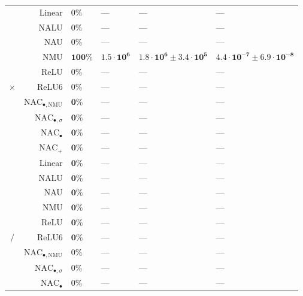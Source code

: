 \begin{longtable}{crllll}
 & Linear & $0\%$ & --- & --- & ---\\

 & NALU & $0\%$ & --- & --- & ---\\

 & NAU & $0\%$ & --- & --- & ---\\

 & NMU & $\mathbf{100\%}$ & $\mathbf{1.5 \cdot 10^{6}}$ & $\mathbf{1.8 \cdot 10^{6} \pm 3.4 \cdot 10^{5}}$ & $\mathbf{4.4 \cdot 10^{-7} \pm 6.9 \cdot 10^{-8}}$\\

 & ReLU & $0\%$ & --- & --- & ---\\

\multirow{-10}{*}{\centering\arraybackslash $\bm{\times}$} & ReLU6 & $0\%$ & --- & --- & ---\\
\cmidrule{1-6}
 & $\mathrm{NAC}_{\bullet,\mathrm{NMU}}$ & $\mathbf{0\%}$ & --- & --- & ---\\

 & $\mathrm{NAC}_{\bullet,\sigma}$ & $\mathbf{0\%}$ & --- & --- & ---\\

 & $\mathrm{NAC}_{\bullet}$ & $\mathbf{0\%}$ & --- & --- & ---\\

 & $\mathrm{NAC}_{+}$ & $\mathbf{0\%}$ & --- & --- & ---\\

 & Linear & $\mathbf{0\%}$ & --- & --- & ---\\

 & NALU & $\mathbf{0\%}$ & --- & --- & ---\\

 & NAU & $\mathbf{0\%}$ & --- & --- & ---\\

 & NMU & $\mathbf{0\%}$ & --- & --- & ---\\

 & ReLU & $\mathbf{0\%}$ & --- & --- & ---\\

\multirow{-10}{*}{\centering\arraybackslash $\bm{\mathbin{/}}$} & ReLU6 & $\mathbf{0\%}$ & --- & --- & ---\\
\cmidrule{1-6}
 & $\mathrm{NAC}_{\bullet,\mathrm{NMU}}$ & $0\%$ & --- & --- & ---\\

 & $\mathrm{NAC}_{\bullet,\sigma}$ & $0\%$ & --- & --- & ---\\

 & $\mathrm{NAC}_{\bullet}$ & $0\%$ & --- & --- & ---\\


\end{longtable}
